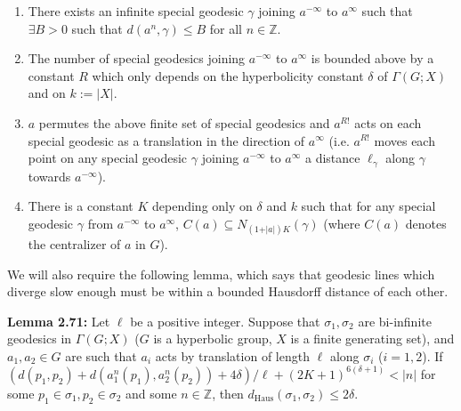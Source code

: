 \documentclass[12pt]{article}
\newcommand{\vs}{\vskip10pt}
\begin{document}
	\begin{enumerate}[label = (\roman*)]
		\item There exists an infinite special geodesic $\gamma$ joining $a^{-\infty}$ to $a^{\infty}$ such that $\exists B > 0$ such that $d(a^n, \gamma) \leq B$ for all $n \in \mathbb{Z}$. 
		\item The number of special geodesics joining $a^{-\infty}$ to $a^{\infty}$ is bounded above by a constant $R$ which only depends on the hyperbolicity constant $\delta$ of $\Gamma(G; X)$ and on $k := \vert X \vert$. 
		\item $a$ permutes the above finite set of special geodesics and $a^{R!}$ acts on each special geodesic as a translation in the direction of $a^{\infty}$ (i.e. $a^{R!}$ moves each point on any special geodesic $\gamma$ joining $a^{-\infty}$ to $a^{\infty}$ a distance $\ell_{\gamma}$ along $\gamma$ towards $a^{- \infty}$). 
		\item There is a constant $K$ depending only on $\delta$ and $k$ such that for any special geodesic $\gamma$ from $a^{-\infty}$ to $a^{\infty}$, $C(a) \subseteq N_{(1 + \vert a \vert)K}(\gamma)$ (where $C(a)$ denotes the centralizer of $a$ in $G$). 
	\end{enumerate}

	We will also require the following lemma, which says that geodesic lines which diverge slow enough must be within a bounded Hausdorff distance of each other.
	
	\vs 
	
	\textbf{Lemma 2.71: } Let $\ell$ be a positive integer. Suppose that $\sigma_1, \sigma_2$ are bi-infinite geodesics in $\Gamma(G; X)$ ($G$ is a hyperbolic group, $X$ is a finite generating set), and $a_1, a_2 \in G$ are such that $a_i$ acts by translation of length $\ell$ along $\sigma_i$ ($i=1,2$). If $(d(p_1, p_2) + d(a_1^n(p_1), a_2^n(p_2)) + 4 \delta)/\ell + (2K+1)^{6 (\delta + 1)} < \vert n \vert$ for some $p_1 \in \sigma_1, p_2 \in \sigma_2$ and some $n \in \mathbb{Z}$, then $d_{\text{Haus}}(\sigma_1, \sigma_2) \leq 2 \delta$.  
	
\end{document}
